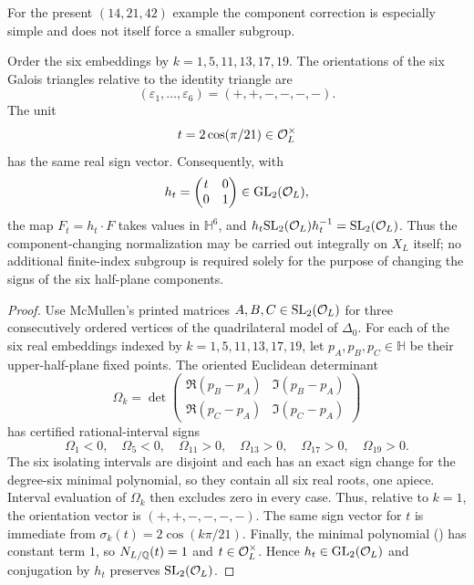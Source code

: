 For the present $(14,21,42)$ example the component correction is especially simple and
does not itself force a smaller subgroup.

\begin{proposition}\label{prop:orientationt}
Order the six embeddings by $k=1,5,11,13,17,19$.  The orientations of the six
Galois triangles relative to the identity triangle are
\[
 (\varepsilon_1,\ldots,\varepsilon_6)=(+,+,-,-,-,-).
\]
The unit
\[
 t=2\cos(\pi/21)\in\mathcal O_L^\times
\]
has the same real sign vector.  Consequently, with
\[
 h_t=\begin{pmatrix}t&0\\0&1\end{pmatrix}\in\mathrm{GL}_2(\mathcal O_L),
\]
the map $F_t=h_t\cdot F$ takes values in $\mathbb H^6$, and
$h_t\mathrm{SL}_2(\mathcal O_L)h_t^{-1}=\mathrm{SL}_2(\mathcal O_L)$.  Thus the component-changing
normalization may be carried out integrally on $X_L$ itself; no additional finite-index
subgroup is required solely for the purpose of changing the signs of the six half-plane
components.
\end{proposition}
\begin{proof}
Use McMullen's printed matrices $A,B,C\in\mathrm{SL}_2(\mathcal O_L)$ for three consecutively
ordered vertices of the quadrilateral model of $\Delta_0$.  For each of the six real
embeddings indexed by $k=1,5,11,13,17,19$, let $p_A,p_B,p_C\in\mathbb H$ be their
upper-half-plane fixed points.  The oriented Euclidean determinant
\[
 \Omega_k=\det\!\begin{pmatrix}
 \Re(p_B-p_A)&\Im(p_B-p_A)\\
 \Re(p_C-p_A)&\Im(p_C-p_A)
 \end{pmatrix}
\]
has certified rational-interval signs
\[
 \Omega_1<0,\quad \Omega_5<0,\quad
 \Omega_{11}>0,\quad\Omega_{13}>0,\quad\Omega_{17}>0,\quad\Omega_{19}>0.
\]
The six isolating intervals are disjoint and each has an exact sign change for the degree-six
minimal polynomial, so they contain all six real roots, one apiece.  Interval evaluation of
$\Omega_k$ then excludes zero in every case.  Thus, relative to $k=1$, the orientation
vector is $(+,+,-,-,-,-)$.  The same sign
vector for $t$ is immediate from
$\sigma_k(t)=2\cos(k\pi/21)$.  Finally, the minimal polynomial
() has constant term $1$, so
$N_{L/\mathbb Q}(t)=1$ and $t\in\mathcal O_L^\times$.  Hence $h_t\in\mathrm{GL}_2(\mathcal O_L)$ and
conjugation by $h_t$ preserves $\mathrm{SL}_2(\mathcal O_L)$.
\end{proof}

